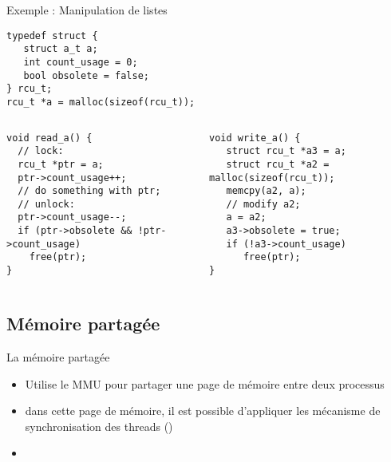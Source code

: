 \begin{frame}[fragile]{Exemple : Manipulation de listes}
  \begin{center}
    \begin{lstlisting}[basicstyle=\ttfamily\scriptsize\color{colBasic},commentstyle=\scriptsize\itshape\color{colComments},numbers=none]
typedef struct {
   struct a_t a;
   int count_usage = 0;
   bool obsolete = false;
} rcu_t;
rcu_t *a = malloc(sizeof(rcu_t));
    \end{lstlisting}
  \end{center}
  \begin{columns}
    \begin{column}{5cm}
      \begin{lstlisting}[basicstyle=\ttfamily\scriptsize\color{colBasic},commentstyle=\scriptsize\itshape\color{colComments},numbers=none]
void read_a() {
  // lock:
  rcu_t *ptr = a;
  ptr->count_usage++;
  // do something with ptr;
  // unlock:
  ptr->count_usage--;
  if (ptr->obsolete && !ptr->count_usage)
    free(ptr);
}
      \end{lstlisting}
    \end{column}
    \begin{column}{5cm}
      \begin{lstlisting}[basicstyle=\ttfamily\scriptsize\color{colBasic},commentstyle=\scriptsize\itshape\color{colComments},numbers=none]
void write_a() {
   struct rcu_t *a3 = a;
   struct rcu_t *a2 = malloc(sizeof(rcu_t));
   memcpy(a2, a);
   // modify a2;
   a = a2;
   a3->obsolete = true;
   if (!a3->count_usage)
      free(ptr);
}
      \end{lstlisting}
    \end{column}
  \end{columns}
\end{frame}

\subsection{Mémoire partagée}

\begin{frame}[fragile=singleslide]{La mémoire partagée}
  \begin{itemize}
  \item Utilise  le MMU pour partager  une page de  mémoire entre deux
    processus
  \item dans  cette page de  mémoire, il est possible  d'appliquer les
    mécanisme        de       synchronisation        des       threads
    ()
  \item
  \end{itemize}
\end{frame}

